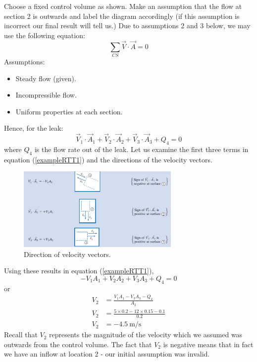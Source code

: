 \documentclass[class=report, crop=false, 12pt,a4paper]{standalone}
\begin{document}
Choose a fixed control volume as shown. Make an assumption that the flow at section 2 is outwards and label the diagram accordingly (if this assumption is incorrect our final result will tell us.) Due to assumptions 2 and 3 below, we may use the following equation:
\begin{equation}
  \sum_{CS} \vec{V} \cdot \vec{A} = 0
\end{equation}
Assumptions:
\begin{itemize}[noitemsep]
  \item Steady flow (given).
  \item Incompressible flow.
  \item Uniform properties at each section.
\end{itemize}
Hence, for the leak:
\begin{equation}
  \vec{V}_1 \cdot \vec{A}_1 + \vec{V}_2 \cdot \vec{A}_2 + \vec{V}_3 \cdot \vec{A}_3 + Q_4 = 0
  \label{exampleRTT1}
\end{equation}
where $Q_4$ is the flow rate out of the leak. Let us examine the first three terms in equation (\ref{exampleRTT1}) and the directions of the velocity vectors.
\begin{figure}
  \centering
  \includegraphics[width = 0.7\textwidth]{../img/RTTexample2}
  \caption{Direction of velocity vectors. }
\end{figure}
Using these results in equation (\ref{exampleRTT1}),
\begin{equation}
  -V_1 A_1 + V_2 A_2 + V_3 A_3 + Q_4 = 0
\end{equation}
or
\begin{align}
  V_2 &= \frac{V_1 A_1 - V_3 A_3 - Q_4}{A_2}\\
  V_2 &= \frac{5\times 0.2 - 12\times 0.15 - 0.1}{0.2}\\
  V_2 &= -4.5 \ \si{\meter\per\second}
\end{align}
Recall that $V_2$ represents the magnitude of the velocity which we assumed was outwards from the control volume. The fact that $V_2$ is negative means that in fact we have an inflow at location 2 - our initial assumption was invalid.
\end{document}
